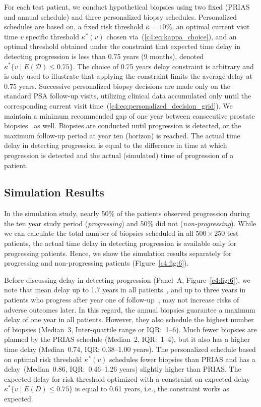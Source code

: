 For each test patient, we conduct hypothetical biopsies using two fixed (PRIAS and annual schedule) and three personalized biopsy schedules. Personalized schedules are based on, a fixed risk threshold $\kappa=10\%$, an optimal current visit time $v$ specific threshold $\kappa^*(v)$ chosen via~(\ref{c4:eq:kappa_choice}), and an optimal threshold obtained under the constraint that expected time delay in detecting progression is less than 0.75 years (9 months), denoted $\kappa^*\{v \mid E(\mathcal{D})\leq 0.75\}$. The choice of 0.75 years delay constraint is arbitrary and is only used to illustrate that applying the constraint limits the average delay at 0.75 years. Successive personalized biopsy decisions are made only on the standard PSA follow-up visits, utilizing clinical data accumulated only until the corresponding current visit time~(\ref{c4:eq:personalized_decision_grid}). We maintain a minimum recommended gap of one year between consecutive prostate biopsies~\citep{bokhorst2015compliance} as well. Biopsies are conducted until progression is detected, or the maximum follow-up period at year ten (horizon) is reached. The actual time delay in detecting progression is equal to the difference in time at which progression is detected and the actual (simulated) time of progression of a patient.

\subsection{Simulation Results}
In the simulation study, nearly 50\% of the patients observed progression during the ten year study period (\emph{progressing}) and 50\% did not (\emph{non-progressing}). While we can calculate the total number of biopsies scheduled in all $500 \times 250$ test patients, the actual time delay in detecting progression is available only for progressing patients. Hence, we show the simulation results separately for progressing and non-progressing patients (Figure~\ref{c4:fig:6}).

Before discussing delay in detecting progression (Panel~A, Figure~\ref{c4:fig:6}), we note that mean delay up to 1.7 years in all patients~\citep{inoue2018comparative}, and up to three years in patients who progress after year one of follow-up~\citep{carvalho}, may not increase risks of adverse outcomes later. In this regard, the annual biopsies guarantee a maximum delay of one year in all patients. However, they also schedule the highest number of biopsies (Median~3, Inter-quartile range or IQR:~1--6). Much fewer biopsies are planned by the PRIAS schedule (Median~2, IQR:~1--4), but it also has a higher time delay (Median~0.74, IQR: 0.38--1.00 years). The personalized schedule based on optimal risk threshold $\kappa^*(v)$ schedules fewer biopsies than PRIAS and has a delay~(Median~0.86, IQR:~0.46--1.26 years) slightly higher than PRIAS. The expected delay for risk threshold optimized with a constraint on expected delay $\kappa^*\{v \mid E(D)\leq 0.75\}$ is equal to 0.61 years, i.e., the constraint works as expected.


